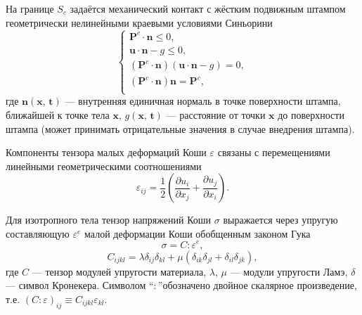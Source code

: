 \documentclass[]{article}
\begin{document}
На границе $S_{c}$ задаётся механический контакт с жёстким подвижным штампом геометрически нелинейными краевыми условиями Синьорини \cite{Kravchuk1994} 
\begin{equation}
\begin{cases}
\mathbf{P}^c\cdot\mathbf{n}\leq 0, \\
\mathbf{u}\cdot\mathbf{n}-g\leq 0, \\
\left(\mathbf{P}^c\cdot\mathbf{n}\right) \left(\mathbf{u}\cdot\mathbf{n}-g\right)=0, \\
\left( \mathbf{P}^c\cdot\mathbf{n}\right)\mathbf{n}=\mathbf{P}^c, \\
\end{cases}
\label{F:F_Contact_Signorini}
\end{equation}
где $\mathbf{n}\left(\mathbf{x},\,\mathbf{t}\right)$ --- внутренняя единичная нормаль в точке поверхности штампа, ближайшей к точке тела $\mathbf{x}$, $g\left(\mathbf{x},\,\mathbf{t}\right) $ --- расстояние от точки $\mathbf{x}$ до поверхности штампа (может принимать отрицательные значения в случае внедрения штампа).


Компоненты тензора малых деформаций Коши $\varepsilon$ связаны с перемещениями линейными геометрическими соотношениями
\begin{equation}
\varepsilon_{ij}=\frac{1}{2} \left(\frac{\partial u_{i}}{\partial x_{j}} + \frac{\partial u_{j}}{\partial x_{i}} \right).
\label{F:F4}
\end{equation}

Для изотропного тела тензор напряжений Коши $\sigma$ выражается через упругую составляющую $\varepsilon^{e}$ малой деформации Коши обобщенным законом Гука
\begin{equation}
\sigma=C:\varepsilon^{e},
\label{F:F_Hook}
\end{equation}
\begin{equation}
C_{ijkl}=\lambda\delta_{ij}\delta_{kl}+\mu\left(\delta_{ik}\delta_{jl}+\delta_{il}\delta_{jk}\right),
\label{F:F5}
\end{equation}
где $C$ --- тензор модулей упругости материала, $\lambda$, $\mu$ --- модули упругости Ламэ, $\delta$ --- символ Кронекера. Символом \textquotedblleft $:$\textquotedblright обозначено двойное скалярное произведение, т.е. $\left(C:\varepsilon\right)_{ij}\equiv C_{ijkl}\varepsilon_{kl}$.
\end{document}
